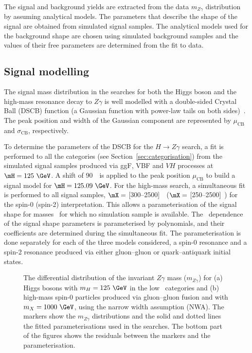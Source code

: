 The signal and background yields are extracted from the
data $m_{Z\gamma}$ distribution by assuming analytical models.
The parameters that describe the shape of the signal are obtained from simulated signal samples. 
The analytical models used for the background shape are chosen using simulated background
samples and the values of their free parameters are determined from the fit to data.


\subsection{Signal modelling}
\label{sec:signalModel}

The signal mass distribution in the searches for both the Higgs boson and the high-mass resonance decay to $Z\gamma$ is well 
modelled with a double-sided
Crystal Ball (DSCB) function (a Gaussian function with power-law tails on both sides)~\cite{dscb1, dscb2}.
The peak position 
and width
of the Gaussian component are represented by $\mu_\mathrm{CB}$ and $\sigma_\mathrm{CB}$, respectively.


To determine the parameters of the DSCB for the $H\to Z\gamma$ search, a 
fit is performed to all the categories (see Section~\ref{sec:categorisation})
from the simulated signal samples produced via ggF, VBF and $VH$ processes at $\mH = 125~\GeV$. 
A shift of 90~\MeV\ is applied
to the peak position $\mu_\mathrm{CB}$
to build a signal model for $\mH = 125.09~\GeV$.
For the high-mass search, a simultaneous fit is performed to all signal samples,
$\mX = $ [300--2500]~\GeV\ ($\mX = $ [250--2500]~\GeV) for the spin-0 (spin-2) interpretation. 
This allows a parameterisation of
the signal shape for masses \mX\ for which no simulation sample is available.
The \mX\ dependence of the signal shape parameters is parameterised by polynomials, 
and their coefficients are determined during the simultaneous fit.
The parameterisation is done separately for each of the three models considered, a spin-0 resonance
and a spin-2 resonance produced via either gluon--gluon or quark--antiquark initial states.

\begin{figure}
\begin{center}
%
\end{center}
\caption{The differential distribution of the invariant $Z\gamma$ mass ($m_{Z\gamma}$) for (a) Higgs
bosons with $m_H=125~\GeV$ in the low \ptt\ 
categories and (b) high-mass spin-0 particles produced 
via gluon--gluon fusion and with $m_X=1000~\GeV$, using the narrow width assumption (NWA). 
The markers show the $m_{Z\gamma}$ distributions and 
the solid and dotted lines the fitted parameterisations used in the searches.
The bottom part of the figures shows the residuals between the markers and the 
parameterisation.}
\label{fig:sig-mmg-fit}
\end{figure}


